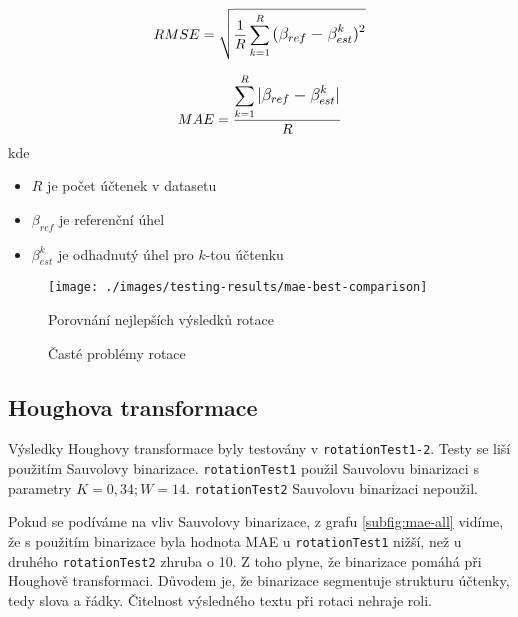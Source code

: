 \documentclass[thesis=B,czech]{FITthesis}[2019/12/23]
\newcommand\ddfrac[2]{\frac{\displaystyle #1}{\displaystyle #2}}
\def\myit#1{\texttt{#1}}
\begin{document}
\begin{equation}
	\label{eqn:rmse}
	RMSE = \sqrt{\frac{1}{R}\sum\limits_{k=1}^{R} \mathlarger{(\beta_{ref}-\beta^{k}_{est})^2}}
\end{equation}

\begin{equation}
	\label{eqn:mae}
	MAE = \ddfrac{\sum\limits_{k=1}^{R} \mathlarger{|\beta_{ref}-\beta_{est}^{k}|}}{R}
\end{equation}
kde
\begin{itemize}[label=]
    \setlength\itemsep{-2pt}
    \item $R$ je počet účtenek v datasetu
    \item $\beta_{ref}$ je referenční úhel
    \item $\beta^{k}_{est}$ je odhadnutý úhel pro $k$-tou účtenku
\end{itemize}

\begin{figure}[ph]
    \centering
    \texttt{[image: ./images/testing-results/mae-best-comparison]}
    \caption{Porovnání nejlepších výsledků rotace}
    \label{fig:mae-best-compar}
\end{figure}

\begin{figure}[ph]
	\caption{Časté problémy rotace}
\end{figure}

\newpage
\subsection{Houghova transformace}
\label{subsec:results-hough-transform}
Výsledky Houghovy transformace byly testovány v \myit{rotationTest1-2}. Testy se liší použitím Sauvolovy binarizace. \myit{rotationTest1} použil Sauvolovu binarizaci s parametry $K=0,34; W=14$. \myit{rotationTest2} Sauvolovu binarizaci nepoužil.

Pokud se podíváme na vliv Sauvolovy binarizace, z grafu \ref{subfig:mae-all} vidíme, že s použitím binarizace byla hodnota MAE u \myit{rotationTest1} nižší, než u druhého \myit{rotationTest2} zhruba o 10. Z toho plyne, že binarizace pomáhá při Houghově transformaci. Důvodem je, že binarizace segmentuje strukturu účtenky, tedy slova a řádky. Čitelnost výsledného textu při rotaci nehraje roli.
\end{document}
